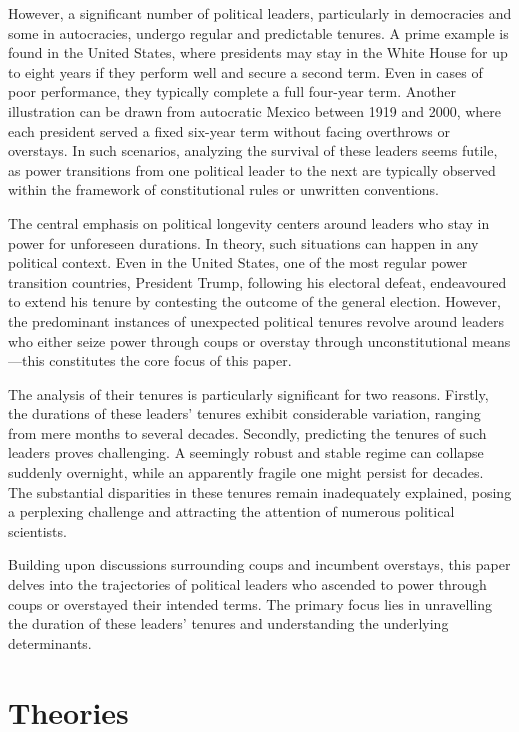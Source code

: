 \documentclass[
  a4paper,
  12pt]{article}
\begin{document}
However, a significant number of political leaders, particularly in
democracies and some in autocracies, undergo regular and predictable
tenures. A prime example is found in the United States, where presidents
may stay in the White House for up to eight years if they perform well
and secure a second term. Even in cases of poor performance, they
typically complete a full four-year term. Another illustration can be
drawn from autocratic Mexico between 1919 and 2000, where each president
served a fixed six-year term without facing overthrows or overstays. In
such scenarios, analyzing the survival of these leaders seems futile, as
power transitions from one political leader to the next are typically
observed within the framework of constitutional rules or unwritten
conventions.

The central emphasis on political longevity centers around leaders who
stay in power for unforeseen durations. In theory, such situations can
happen in any political context. Even in the United States, one of the
most regular power transition countries, President Trump, following his
electoral defeat, endeavoured to extend his tenure by contesting the
outcome of the general election. However, the predominant instances of
unexpected political tenures revolve around leaders who either seize
power through coups or overstay through unconstitutional means---this
constitutes the core focus of this paper.

The analysis of their tenures is particularly significant for two
reasons. Firstly, the durations of these leaders' tenures exhibit
considerable variation, ranging from mere months to several decades.
Secondly, predicting the tenures of such leaders proves challenging. A
seemingly robust and stable regime can collapse suddenly overnight,
while an apparently fragile one might persist for decades. The
substantial disparities in these tenures remain inadequately explained,
posing a perplexing challenge and attracting the attention of numerous
political scientists.

Building upon discussions surrounding coups and incumbent overstays,
this paper delves into the trajectories of political leaders who
ascended to power through coups or overstayed their intended terms. The
primary focus lies in unravelling the duration of these leaders' tenures
and understanding the underlying determinants.

\section{Theories}\label{theories}
\end{document}
